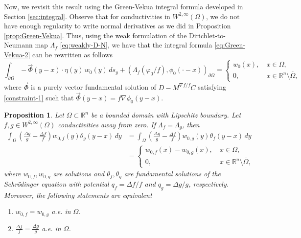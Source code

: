 \documentclass[12pt]{article}
\newtheorem{proposition}[theorem]{Proposition}
\def\R{\mathbb{R}}
\begin{document}
Now, we revisit this result using the Green-Vekua integral formula developed in Section \ref{sec:integral}. Observe that for conductivities in $W^{2, \infty}(\Omega)$, we do not have enough regularity to write normal derivatives as we did in Proposition \ref{prop:Green-Vekua}. Thus, using the weak formulation of the Dirichlet-to-Neumann map $\Lambda_{f}$ \eqref{eq:weakly-D-N}, we have that the integral formula \eqref{eq:Green-Vekua-2} can be rewritten as follows
\begin{equation}\label{eq:Green-Vekua-3}
\int_{\partial \Omega} - \vec \Phi(y-x)\cdot \eta(y)\, w_0(y)\, ds_y+ \left(\Lambda_{f}(\varphi_0/f), \phi_0(\cdot-x)\right)_{\partial\Omega}=\left\{
   \begin{array}{ll}
      w_{0}(x), \ & x\in \Omega,\\
      0,           & x\in \R^n\setminus \overline{\Omega},
   \end{array}
\right.
\end{equation}
where $\vec \Phi$ is a purely vector fundamental solution of $D-M^{\nabla f/f} C$ satisfying \eqref{constraint-1} such that $\vec \Phi(y-x)=f\nabla \phi_0(y-x)$.
\begin{proposition}\label{prop:difference-potentials}
Let $\Omega\subset \mathbb{R}^n$ be a bounded domain with Lipschitz boundary. Let $f, g\in W^{2,\infty}(\Omega)$ conductivities away from zero. If $\Lambda_f=\Lambda_g$, then 
\begin{align}\label{eq:identity-potential}
\int_{\Omega} \left(\frac{\Delta g}{g}-\frac{\Delta f}{f}\right) w_{0,f}(y)\theta_g(y-x)\, dy&=\int_{\Omega} \left(\frac{\Delta g}{g}-\frac{\Delta f}{f}\right) w_{0,g}(y)\theta_f(y-x)\, dy \nonumber\\
&=\left\{
   \begin{array}{ll}
      w_{0,f}(x)-w_{0,g}(x), \ & x\in \Omega,\\
      0,           & x\in \R^n\setminus \overline{\Omega},
   \end{array}
\right.
\end{align}
where $w_{0,f}, w_{0,g}$ are solutions and $\theta_f, \theta_g$ are fundamental solutions of the Schr\"{o}dinger equation with potential $q_f=\Delta f/f$ and $q_g=\Delta g/g$, respectively. Moreover, the following statements are equivalent
\begin{enumerate}
    \item[(i)]  $w_{0,f}=w_{0,g}$ a.e. in $\Omega$.
     \item[(ii)] $\frac{\Delta f}{f}=\frac{\Delta g}{g}$ a.e. in $\Omega$.
\end{enumerate} 
\end{proposition}
\end{document}
